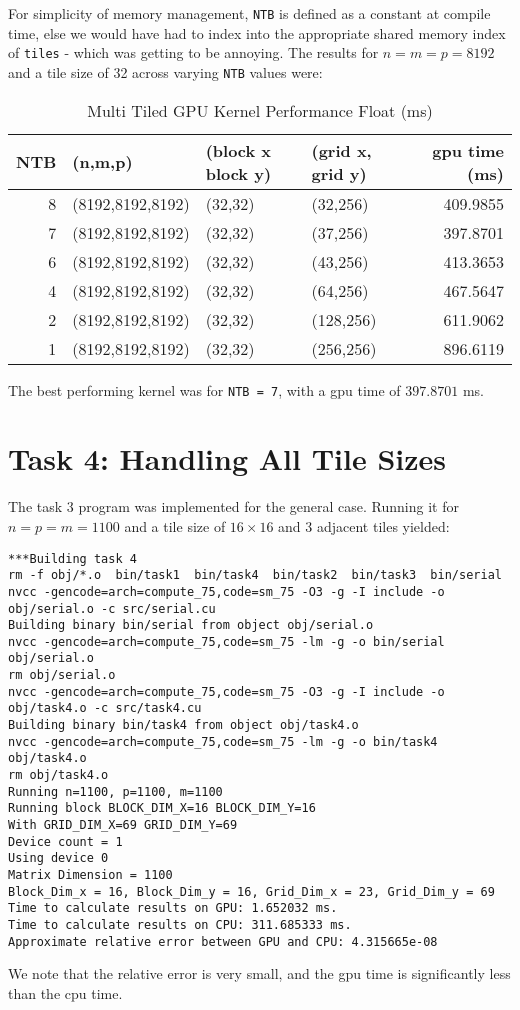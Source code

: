 \documentclass{article}
\begin{document}
For simplicity of memory management, \texttt{NTB} is defined as a constant at 
compile time, else we would have had to index into the appropriate shared memory 
index of \texttt{tiles} - which was getting to be annoying.
The results for $n = m = p = 8192$ and a tile size of 32 across varying \texttt{NTB} values were:
\begin{table}[H]
    \centering
    \caption{Multi Tiled GPU Kernel Performance Float (ms)}
    \fontsize{12}{14}\selectfont
    \begin{tabular}[t]{rlllr}
    \toprule
    NTB & (n,m,p) & (block x block y) & (grid x, grid y) & gpu time (ms)\\
    \midrule
    8 & (8192,8192,8192) & (32,32) & (32,256) & 409.9855\\
    7 & (8192,8192,8192) & (32,32) & (37,256) & 397.8701\\
    6 & (8192,8192,8192) & (32,32) & (43,256) & 413.3653\\
    4 & (8192,8192,8192) & (32,32) & (64,256) & 467.5647\\
    2 & (8192,8192,8192) & (32,32) & (128,256) & 611.9062\\
    1 & (8192,8192,8192) & (32,32) & (256,256) & 896.6119\\
    \bottomrule
    \end{tabular}
\end{table}
\noindent The best performing kernel was for \texttt{NTB = 7}, with a gpu time of $397.8701$ ms.

\section{Task 4: Handling All Tile Sizes}
The task 3 program was implemented for the general case. Running it for $n=p=m=1100$ and 
a tile size of $16\times 16$ and 3 adjacent tiles yielded:
\begin{verbatim}
***Building task 4
rm -f obj/*.o  bin/task1  bin/task4  bin/task2  bin/task3  bin/serial 
nvcc -gencode=arch=compute_75,code=sm_75 -O3 -g -I include -o obj/serial.o -c src/serial.cu
Building binary bin/serial from object obj/serial.o
nvcc -gencode=arch=compute_75,code=sm_75 -lm -g -o bin/serial obj/serial.o
rm obj/serial.o
nvcc -gencode=arch=compute_75,code=sm_75 -O3 -g -I include -o obj/task4.o -c src/task4.cu
Building binary bin/task4 from object obj/task4.o
nvcc -gencode=arch=compute_75,code=sm_75 -lm -g -o bin/task4 obj/task4.o
rm obj/task4.o
Running n=1100, p=1100, m=1100
Running block BLOCK_DIM_X=16 BLOCK_DIM_Y=16
With GRID_DIM_X=69 GRID_DIM_Y=69
Device count = 1
Using device 0
Matrix Dimension = 1100
Block_Dim_x = 16, Block_Dim_y = 16, Grid_Dim_x = 23, Grid_Dim_y = 69
Time to calculate results on GPU: 1.652032 ms.
Time to calculate results on CPU: 311.685333 ms.
Approximate relative error between GPU and CPU: 4.315665e-08
\end{verbatim}
We note that the relative error is very small, and the gpu time is significantly
less than the cpu time.
\end{document}
